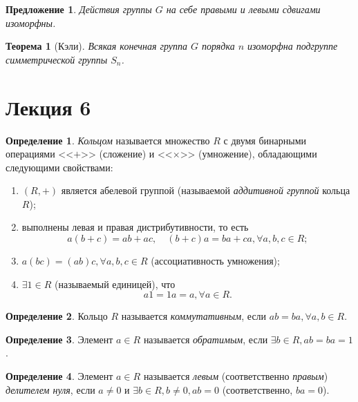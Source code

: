 \documentclass[a4paper]{article}
\theoremstyle{plain}
\newtheorem*{theorem}{Теорема}
\newtheorem{proposal}{Предложение}
\theoremstyle{definition}
\newtheorem{definition}{Определение}
\numberwithin{definition}{section}
\numberwithin{proposal}{section}
\begin{document}
\begin{proposal}
Действия группы \(G\) на себе правыми и левыми сдвигами изоморфны.
\end{proposal}

\begin{theorem}[Кэли]
Всякая конечная группа \(G\) порядка \(n\) изоморфна подгруппе симметрической группы \(S_n\).
\end{theorem}


\section{Лекция 6}

\begin{definition}
\emph{Кольцом} называется множество \(R\) с двумя бинарными операциями <<\(+\)>> (сложение) и <<\(\times\)>> (умножение), обладающими следующими свойствами:
\begin{enumerate}
	\item \((R, +)\) является абелевой группой (называемой \emph{аддитивной группой} кольца \(R\));
	\item выполнены левая и правая дистрибутивности, то есть
	\begin{equation*}
		a(b + c) = ab + ac, \quad (b + c)a = ba + ca, \forall a, b, c \in R;
	\end{equation*}
	\item \(a(bc) = (ab)c, \forall a, b, c \in R\) (ассоциативность умножения);
	\item \(\exists 1 \in R\) (называемый единицей), что
	\begin{equation*}
		a1 = 1a = a, \forall a \in R.
	\end{equation*}
\end{enumerate}
\end{definition}

\begin{definition}
Кольцо \(R\) называется \emph{коммутативным}, если \(ab = ba, \forall a, b \in R\).
\end{definition}

\begin{definition}
Элемент \(a \in R\) называется \emph{обратимым}, если \(\exists b \in R, ab = ba = 1\). 
\end{definition}

\begin{definition}
Элемент \(a \in R\) называется \emph{левым} (соответственно \emph{правым}) \emph{делителем нуля}, если \(a \neq 0\) и \(\exists b \in R, b \neq 0, ab = 0\) (соответственно, \(ba = 0\)).
\end{definition}
\end{document}
